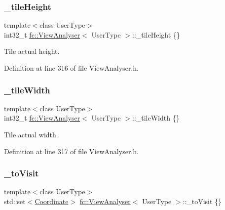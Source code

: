 \subsubsection{\texorpdfstring{\+\_\+tile\+Height}{\_tileHeight}}
{\footnotesize\ttfamily template$<$class User\+Type$>$ \\
int32\+\_\+t \hyperlink{classfc_1_1ViewAnalyser}{fc\+::\+View\+Analyser}$<$ User\+Type $>$\+::\+\_\+tile\+Height \{\}\hspace{0.3cm}{\ttfamily [private]}}



Tile actual height. 



Definition at line 316 of file View\+Analyser.\+h.

\mbox{\label{classfc_1_1ViewAnalyser_a59d87a42c4e6e38be83e83f56d8e5fc4}} 
\subsubsection{\texorpdfstring{\+\_\+tile\+Width}{\_tileWidth}}
{\footnotesize\ttfamily template$<$class User\+Type$>$ \\
int32\+\_\+t \hyperlink{classfc_1_1ViewAnalyser}{fc\+::\+View\+Analyser}$<$ User\+Type $>$\+::\+\_\+tile\+Width \{\}\hspace{0.3cm}{\ttfamily [private]}}



Tile actual width. 



Definition at line 317 of file View\+Analyser.\+h.

\mbox{\label{classfc_1_1ViewAnalyser_aa7728b7f80b1eca4b8d9fc726d205a8e}} 
\subsubsection{\texorpdfstring{\+\_\+to\+Visit}{\_toVisit}}
{\footnotesize\ttfamily template$<$class User\+Type$>$ \\
std\+::set$<$\hyperlink{namespacefc_a7da125cb1e99553c27c07139ee8a62ca}{Coordinate}$>$ \hyperlink{classfc_1_1ViewAnalyser}{fc\+::\+View\+Analyser}$<$ User\+Type $>$\+::\+\_\+to\+Visit \{\}\hspace{0.3cm}{\ttfamily [private]}}



